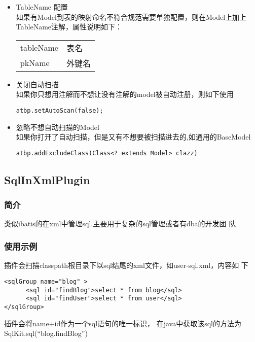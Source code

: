 \documentclass{scrartcl}
\begin{document}
\begin{itemize}
 

\item TableName 配置\\
\label{sec-2-1-2-4}%
如果有Model到表的映射命名不符合规范需要单独配置，则在Model上加上
      TableName注解，属性说明如下：

\begin{tabular}{ll}
 tableName  &  表名    \\
 pkName     &  外键名  \\
\end{tabular}


   

\item 关闭自动扫描\\
\label{sec-2-1-2-5}%
如果你只想用注解而不想让没有注解的model被自动注册，则如下使用

\begin{verbatim}
atbp.setAutoScan(false);
\end{verbatim}


\item 忽略不想自动扫描的Model\\
\label{sec-2-1-2-6}%
如果你打开了自动扫描，但是又有不想要被扫描进去的,如通用的BaseModel

\begin{verbatim}
atbp.addExcludeClass(Class<? extends Model> clazz)
\end{verbatim}
        
\end{itemize} %
\subsection{SqlInXmlPlugin}
\label{sec-2-2}
\subsubsection{简介}
\label{sec-2-2-1}

    类似ibatis的在xml中管理sql.主要用于复杂的sql管理或者有dba的开发团
    队
\subsubsection{使用示例}
\label{sec-2-2-2}

 插件会扫描classpath根目录下以sql结尾的xml文件，如user-sql.xml，内容如
 下

\begin{verbatim}
<sqlGroup name="blog" >
      <sql id="findBlog">select * from blog</sql>
      <sql id="findUser">select * from user</sql>
</sqlGroup>
\end{verbatim}
插件会将name+id作为一个sql语句的唯一标识，
在java中获取该sql的方法为
SqlKit.sql(``blog.findBlog'')
\end{document}
